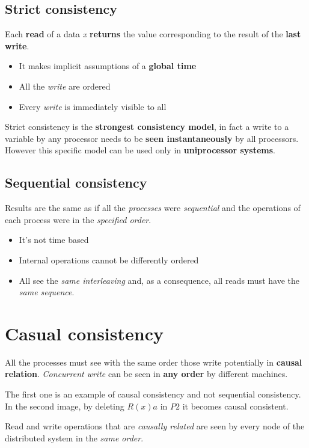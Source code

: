 \subsection{Strict consistency}
Each \textbf{read} of a data \textit{x} \textbf{returns} the value corresponding to the result of the \textbf{last write}.
\begin{itemize}
    \item It makes implicit assumptions of a \textbf{global time}
    \item All the \textit{write} are ordered
    \item Every \textit{write} is immediately visible to all
\end{itemize}


Strict consistency is the \textbf{strongest consistency model}, in fact a write to a variable by any processor needs to be \textbf{seen instantaneously} by all processors. However  this specific model can be used only in \textbf{uniprocessor systems}.

\subsection{Sequential consistency}
Results are the same as if all the \textit{processes} were \textit{sequential} and the operations of each process were in the \textit{specified order}.
\begin{itemize}
    \item It’s not time based
    \item Internal operations cannot be differently ordered
    \item All see the \textit{same interleaving} and, as a consequence, all reads must have the \textit{same sequence}.
\end{itemize}


\section{Casual consistency}
All the processes must see with the same order those write potentially in \textbf{causal relation}. \textit{Concurrent write} can be seen in \textbf{any order} by different machines.


The first one is an example of causal consistency and not sequential consistency. In the second image, by deleting \(R(x)a\) in \(P2\) it becomes causal consistent.

Read and write operations that are \textit{causally related} are seen by every node of the distributed system in the \textit{same order}.

